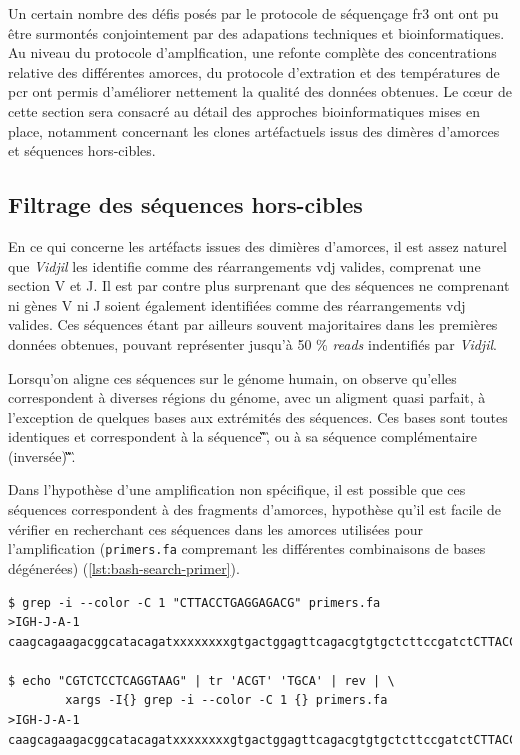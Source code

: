 Un certain nombre des défis posés par le protocole de séquençage \gls{fr}3 ont ont pu être surmontés conjointement par 
des adapations techniques et bioinformatiques. Au niveau du protocole d'amplfication, une refonte complète des concentrations 
relative des différentes amorces, du protocole d'extration et des températures de \gls{pcr} ont permis d'améliorer nettement 
la qualité des données obtenues. Le cœur de cette section sera consacré au détail des approches bioinformatiques mises en place, 
notamment concernant les clones artéfactuels issus des dimères d'amorces et séquences hors-cibles.

\subsection{Filtrage des séquences hors-cibles}

En ce qui concerne les artéfacts issues des dimières d'amorces, il est assez naturel que \textit{Vidjil} les identifie comme 
des réarrangements \gls{vdj} valides, comprenat une section V et J. Il est par contre plus surprenant que des séquences ne comprenant 
ni gènes V ni J soient également identifiées comme des réarrangements \gls{vdj} valides. Ces séquences étant par ailleurs souvent majoritaires 
dans les premières données obtenues, pouvant représenter jusqu'à 50 \% \textit{reads} indentifiés par \textit{Vidjil}.

\vspace{1em}

Lorsqu'on aligne ces séquences sur le génome humain, on observe qu'elles correspondent à diverses régions du génome, avec un aligment quasi 
parfait, à l'exception de quelques bases aux extrémités des séquences. Ces bases sont toutes identiques et correspondent à la séquence 
\C\G\T\C\T\C\C\T\C\A\G\G\T\A\A\G, ou à sa séquence complémentaire (inversée) \C\T\T\A\C\C\T\G\A\G\G\A\G\A\C\G.

\vspace{1em}

Dans l'hypothèse d'une amplification non spécifique, il est possible que ces séquences correspondent à des fragments d'amorces,
hypothèse qu'il est facile de vérifier en recherchant ces séquences dans les amorces utilisées pour l'amplification (\texttt{primers.fa} 
compremant les différentes combinaisons de bases dégénerées)
(\autoref{lst:bash-search-primer}).

\begin{lstlisting}[language=custombash, 
caption={Commande Bash et résultat de la recherche des séquences dans les amorces dégénérées.},
label={lst:bash-search-primer},
basicstyle=\ttfamily\scriptsize]
$ grep -i --color -C 1 "CTTACCTGAGGAGACG" primers.fa
>IGH-J-A-1
caagcagaagacggcatacagatxxxxxxxxgtgactggagttcagacgtgtgctcttccgatctCTTACCTGAGGAGACGgtgacc

$ echo "CGTCTCCTCAGGTAAG" | tr 'ACGT' 'TGCA' | rev | \
        xargs -I{} grep -i --color -C 1 {} primers.fa
>IGH-J-A-1
caagcagaagacggcatacagatxxxxxxxxgtgactggagttcagacgtgtgctcttccgatctCTTACCTGAGGAGACGgtgacc
\end{lstlisting}

